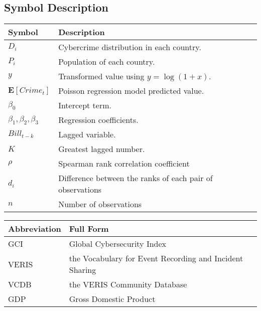 \subsection{Symbol Description}\label{subsec:symbol-description} %
\begin{tabular}{ll}
    \hline
    \textbf{Symbol} & \textbf{Description} \\
    \hline
    $D_i$                     & Cybercrime distribution in each country. \\
    $P_i$                     & Population of each country. \\
    $y$                       & Transformed value using \( y = \log(1 + x) \). \\
    $\mathbf{E}[Crime_t]$     & Poisson regression model predicted value. \\
    $\beta_0$                 & Intercept term. \\
    $\beta_1,\beta_2,\beta_3$ & Regression coefficients. \\
    $Bill_{t-k}$              & Lagged variable. \\
    $K$                       & Greatest lagged number. \\
    $\rho$                    & Spearman rank correlation coefficient \\
    $d_i$                     & Difference between the ranks of each pair of observations \\
    $n$                       & Number of observations \\
    \hline
\end{tabular}

\bigskip

\noindent
\begin{tabular}{ll}
    \hline
    \textbf{Abbreviation} & \textbf{Full Form} \\
    \hline
    GCI   & Global Cybersecurity Index\cite{gci-2024} \\
    VERIS & the Vocabulary for Event Recording and Incident Sharing\cite{veris} \\
    VCDB  & the VERIS Community Database\cite{vcdb} \\
    GDP   & Gross Domestic Product \\
    \hline
\end{tabular}
